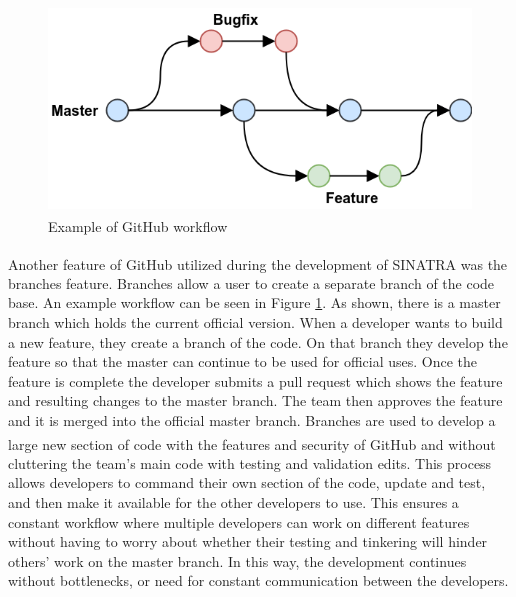 \begin{figure}
\includegraphics[width=.99\textwidth]{figures/github-flow.png}
\centering
\caption[Example of GitHub\textsuperscript{\textregistered} workflow]{Example of GitHub\textsuperscript{\textregistered} workflow \cite{github}}
\label{fig:github}
\end{figure}




\indent Another feature of GitHub\textsuperscript{\textregistered} utilized during the development of SINATRA was the branches feature. Branches allow a user to create a separate branch of the code base. An example workflow can be seen in Figure \ref{fig:github}. As shown, there is a master branch which holds the current official version. When a developer wants to build a new feature, they create a branch of the code. On that branch they develop the feature so that the master can continue to be used for official uses. Once the feature is complete the developer submits a pull request which shows the feature and resulting changes to the master branch. The team then approves the feature and it is merged into the official master branch. Branches are used to develop a large new section of code with the features and security of GitHub\textsuperscript{\textregistered} and without cluttering the team's main code with testing and validation edits. This process allows developers to command their own section of the code, update and test, and then make it available for the other developers to use. This ensures a constant workflow where multiple developers can work on different features without having to worry about whether their testing and tinkering will hinder others' work on the master branch. In this way, the development continues without bottlenecks, or need for constant communication between the developers. \par


